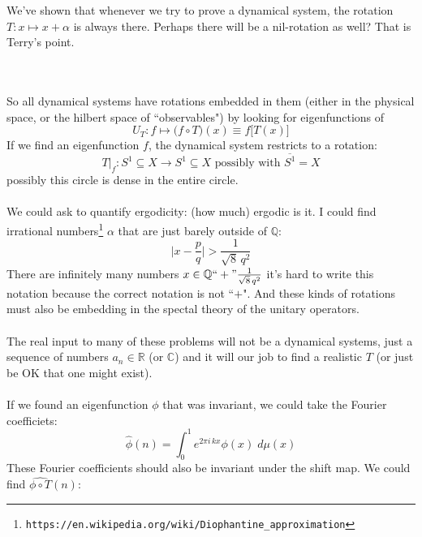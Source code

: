 \documentclass[12pt]{article}
\begin{document}
\noindent We've shown that whenever we try to prove a dynamical system, the rotation $T:x \mapsto x + \alpha$ is always there.  Perhaps there will be a nil-rotation as well?  That is Terry's point.\\ \\
 \\
So all dynamical systems have rotations embedded in them (either in the physical space, or the hilbert space of ``observables") by looking for eigenfunctions of 
$$  U_T : f \mapsto \big( f \circ T \big)(x) \equiv f \big[ T(x)\big] $$
If we find an eigenfunction $f$, the dynamical system restricts to a rotation:
$$  T\Big|_f : S^1 \subseteq X \to S^1 \subseteq X \text{ possibly with } \overline{S^1} = X$$
possibly this circle is dense in the entire circle. \\ \\
We could ask to quantify ergodicity: (how much) ergodic is it.  I could find irrational numbers\footnote{\texttt{https://en.wikipedia.org/wiki/Diophantine\_approximation}} $\alpha$ that are just barely outside of $\mathbb{Q}$: 
$$ \bigg| x - \frac{p}{q} \bigg| > \frac{1}{\sqrt{8} \, q^2} $$ 
There are infinitely many numbers $x \in \mathbb{Q} ``+" \frac{1}{\sqrt{8}\,q^2} $ it's hard to write this notation because the correct notation is not ``$+$".    And these kinds of rotations must also be embedding in the spectal theory of the unitary operators.  \\ \\
The real input to many of these problems will not be a dynamical systems, just a sequence of numbers $a_n \in \mathbb{R}$ (or $\mathbb{C}$) and it will our job to find a realistic $T$ (or just be OK that one might exist). \\ \\
If we found an eigenfunction $\phi$ that was invariant, we could take the Fourier coefficiets:
$$ \widehat{\phi}(n) = \int_0^1 e^{2\pi i \, k x} \phi(x) \; d\mu(x) $$
These Fourier coefficients should also be invariant under the shift map.  We could find $\widehat{\phi \circ T}(n)$:
\end{document}
